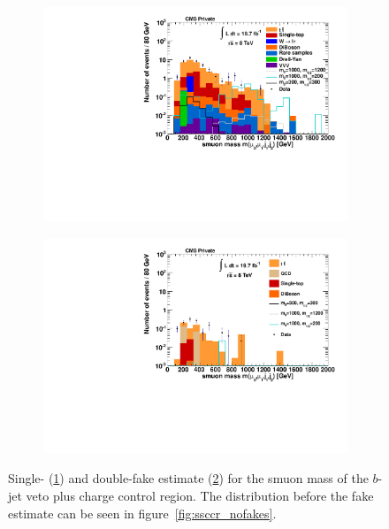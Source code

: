 \begin{figure}[!htbp]
  \centering
  \begin{subfigure}[b]{0.495\textwidth}
    \centering
    \includegraphics[width=\textwidth]{plots/CR6_m_smuon_singlefake.pdf}
    \caption{\label{fig:CRBVC_m_smuon_singlefake}}
  \end{subfigure}
  \begin{subfigure}[b]{0.495\textwidth}
    \centering
    \includegraphics[width=\textwidth]{plots/CR6_m_smuon_doublefake.pdf}
    \caption{\label{fig:CRBVC_m_smuon_doublefake}}
  \end{subfigure}

  \caption{Single- (\ref{fig:CRBVC_m_smuon_singlefake}) and double-fake estimate (\ref{fig:CRBVC_m_smuon_doublefake}) for the smuon mass of the $b$-jet veto plus charge control region. The distribution before the fake estimate can be seen in figure~\ref{fig:ssccr_nofakes}.}
  \label{fig:fakeestimates}
\end{figure}

